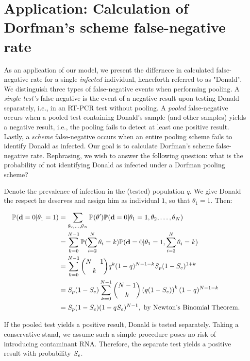 \documentclass{article}
\begin{document}
\section{Application: Calculation of Dorfman's scheme false-negative rate}\label{subsec:detailed}
As an application of our model, we present the differnece in
calculated false-negative rate for a single \emph{infected}
individual, henceforth referred to as "Donald".  We distinguish three
types of false-negative events when performing pooling. A \emph{single
  test's} false-negative is the event of a negative result upon
testing Donald separately, i.e., in an RT-PCR test without pooling. A
\emph{pooled} false-negative occurs when a pooled test containing
Donald's sample (and other samples) yields a negative result, i.e.,
the pooling fails to detect at least one positive result. Lastly, a
\emph{scheme} false-negative occurs when an entire pooling scheme
fails to identify Donald as infected. Our goal is to calculate
Dorfman's scheme false-negative rate. Rephrasing, we wish to answer
the following question: what is the probability of not identifying
Donald as infected under a Dorfman pooling scheme?

Denote the prevalence of infection in the (tested) population $q$. We
give Donald the respect he deserves and assign him as individual $1$,
so that $\theta_1=1$. Then:

\begin{align}
  \begin{split}
    \mathbb{P}(\mathbf{d}=0|\theta_1=1) &= \sum_{\theta_2,\dots,\theta_N} \mathbb{P}(\theta') \mathbb{P}(\mathbf{d}=0|\theta_1=1,\theta_2,\dots,\theta_N) \\
    &= \sum_{k=0}^{N-1}\mathbb{P}(\sum_{i=2}^N\theta_i=k)\mathbb{P}(\mathbf{d}=0|\theta_1=1,\sum_{i=2}^N\theta_i = k)\\
    &= \sum_{k=0}^{N-1}\binom{N-1}{k}q^k(1-q)^{N-1-k} S_p(1-S_e)^{1+k}\\
    &= S_p(1-S_e) \sum_{k=0}^{N-1}\binom{N-1}{k}\left(q(1-S_e)\right)^k(1-q)^{N-1-k}\\
    &= S_p(1-S_e)(1-qS_e)^{N-1}, \text{ by Newton's Binomial Theorem.} \\
  \end{split}
\end{align}

If the pooled test yields a positive result, Donald is tested
separately. Taking a conservative stand, we assume such a simple
procedure poses no risk of introducing contaminant RNA. Therefore, the
separate test yields a positive result with probability $S_e$.
\end{document}
